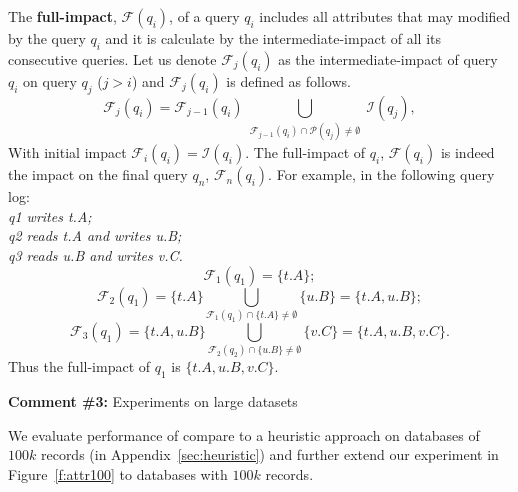 
The \textbf{full-impact}, $\mathcal{F}(q_i)$, of a query $q_i$ includes all
attributes that may modified by the query $q_i$ and it is calculate by the
intermediate-impact of all its consecutive queries. Let us denote
$\mathcal{F}_j(q_i)$ as the intermediate-impact of query $q_i$ on query $q_j$
($j > i$) and $\mathcal{F}_j(q_i)$ is defined as follows.
 \[
    \mathcal{F}_j(q_i)=\mathcal{F}_{j-1}(q_i)\bigcup_{\substack{\mathcal{F}_{j-1}(q_i)\cap \mathcal{P}(q_j) \neq \emptyset}} \mathcal{I}(q_j),
 \]
With initial impact $\mathcal{F}_i(q_i)  = \mathcal{I}(q_i)$. The full-impact of $q_i$, $\mathcal{F}(q_i)$ is indeed the impact on the final query $q_n$, $\mathcal{F}_n(q_i)$. For example, in the following query log:\\
\textit{q1 writes t.A; \\
q2 reads t.A and writes u.B; \\
q3 reads u.B and writes v.C.}\\
\[\mathcal{F}_1(q_1) = \{t.A\};\] 
\[\mathcal{F}_2(q_1) = \{t.A\} \bigcup_{\mathcal{F}_1(q_1) \cap \{t.A\} \neq \emptyset} \{u.B\} = \{t.A, u.B\};\]
\[\mathcal{F}_3(q_1) = \{t.A, u.B\}\bigcup_{\mathcal{F}_2(q_2) \cap \{u.B\} \neq \emptyset} \{v.C\} = \{t.A, u.B, v.C\}.\]
Thus the full-impact of $q_1$ is $\{t.A, u.B, v.C\}$.




\comskip

\noindent
\textbf{Comment \#3:} Experiments on large datasets
\begin{quote}
\end{quote}

We evaluate performance of \sys compare to a heuristic approach on databases
of $100k$ records (in Appendix~\ref{sec:heuristic}) and further extend our
experiment in Figure~\ref{f:attr100} to databases with $100k$ records.

